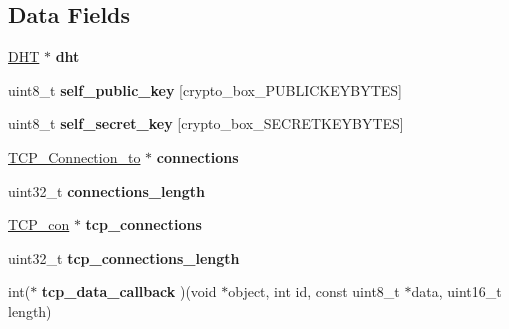 \subsection*{Data Fields}
\begin{DoxyCompactItemize}
\item 
\hypertarget{struct_t_c_p___connections_a8b3d6ce8745acc52695e252bdb1531b6}{\hyperlink{struct_d_h_t}{D\+H\+T} $\ast$ {\bfseries dht}}\label{struct_t_c_p___connections_a8b3d6ce8745acc52695e252bdb1531b6}

\item 
\hypertarget{struct_t_c_p___connections_ae726df8bdc26380e5a6c3187a00d6881}{uint8\+\_\+t {\bfseries self\+\_\+public\+\_\+key} \mbox{[}crypto\+\_\+box\+\_\+\+P\+U\+B\+L\+I\+C\+K\+E\+Y\+B\+Y\+T\+E\+S\mbox{]}}\label{struct_t_c_p___connections_ae726df8bdc26380e5a6c3187a00d6881}

\item 
\hypertarget{struct_t_c_p___connections_aa05050f86513ff53fe9da81f73c72267}{uint8\+\_\+t {\bfseries self\+\_\+secret\+\_\+key} \mbox{[}crypto\+\_\+box\+\_\+\+S\+E\+C\+R\+E\+T\+K\+E\+Y\+B\+Y\+T\+E\+S\mbox{]}}\label{struct_t_c_p___connections_aa05050f86513ff53fe9da81f73c72267}

\item 
\hypertarget{struct_t_c_p___connections_a191cfbdd509a2705455744965ccfd724}{\hyperlink{struct_t_c_p___connection__to}{T\+C\+P\+\_\+\+Connection\+\_\+to} $\ast$ {\bfseries connections}}\label{struct_t_c_p___connections_a191cfbdd509a2705455744965ccfd724}

\item 
\hypertarget{struct_t_c_p___connections_a6c469b329395b7dfc09fc49900bf8f0d}{uint32\+\_\+t {\bfseries connections\+\_\+length}}\label{struct_t_c_p___connections_a6c469b329395b7dfc09fc49900bf8f0d}

\item 
\hypertarget{struct_t_c_p___connections_a600688b27d874e40eab4680fb90fa58a}{\hyperlink{struct_t_c_p__con}{T\+C\+P\+\_\+con} $\ast$ {\bfseries tcp\+\_\+connections}}\label{struct_t_c_p___connections_a600688b27d874e40eab4680fb90fa58a}

\item 
\hypertarget{struct_t_c_p___connections_aa1780d3567bf0105a493ce227133f810}{uint32\+\_\+t {\bfseries tcp\+\_\+connections\+\_\+length}}\label{struct_t_c_p___connections_aa1780d3567bf0105a493ce227133f810}

\item 
\hypertarget{struct_t_c_p___connections_a925f83cd475679a15e0510ad5b02a581}{int($\ast$ {\bfseries tcp\+\_\+data\+\_\+callback} )(void $\ast$object, int id, const uint8\+\_\+t $\ast$data, uint16\+\_\+t length)}\label{struct_t_c_p___connections_a925f83cd475679a15e0510ad5b02a581}


\end{DoxyCompactItemize}
